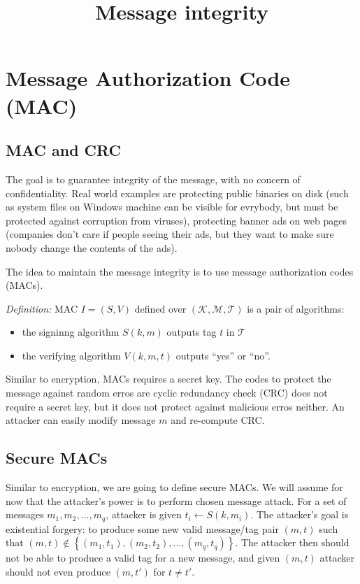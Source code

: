 \documentclass{article}
\title{Message integrity}
\begin{document}
\maketitle

\section{Message Authorization Code (MAC)}

\subsection{MAC and CRC}
The goal is to guarantee integrity of the message, with no concern of
confidentiality. Real world examples are protecting public binaries on disk
(such as system files on Windows machine can be visible for evrybody, but must
be protected against corruption from viruses), protecting banner ads on web
pages (companies don't care if people seeing their ads, but they want to make
sure nobody change the contents of the ads).

The idea to maintain the message integrity is to use message authorization codes
(MACs).

\emph{Definition: } MAC $I = (S, V)$ defined over $(\mathcal {K, M, T})$ is a
pair of algorithms:
\begin{itemize}
\item the signinng algorithm $S(k, m)$ outputs tag $t$ in $\mathcal{T}$
\item the verifying algorithm $V(k, m, t)$ outputs ``yes'' or ``no''.
\end{itemize}

Similar to encryption, MACs requires a secret key. The codes to protect the
message against random erros are cyclic redundancy check (CRC) does not require
a secret key, but it does not protect against malicious erros neither. An
attacker can easily modify message $m$ and re-compute CRC. 

\subsection{Secure MACs}
Similar to encryption, we are going to define secure MACs. We will assume for
now that the attacker's power is to perform chosen message attack. For a set of
messages $m_1, m_2, \dotsc, m_q$, attacker is given $t_i \leftarrow S(k,
m_i)$. The attacker's goal is existential forgery: to produce some new valid
message/tag pair $(m, t)$ such that $(m, t) \notin \left\lbrace (m_1, t_1),
  (m_2, t_2), \dotsc, (m_q, t_q) \right\rbrace$. The attacker then should not be
able to produce a valid tag for a new message, and given $(m, t)$ attacker
should not even produce $(m, t')$ for $t \neq t'$.
\end{document}
